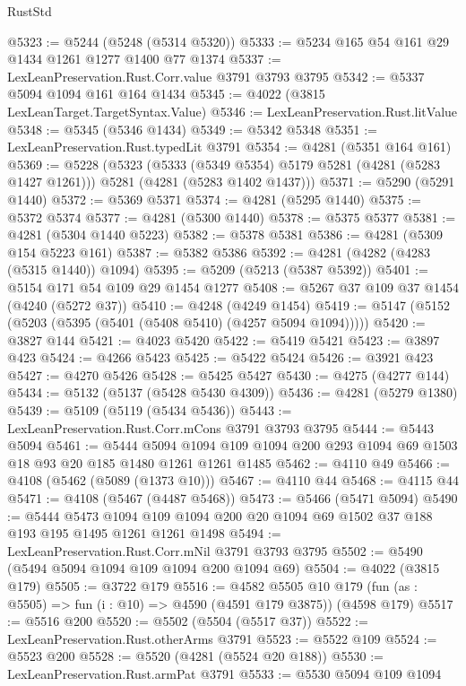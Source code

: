 \begin{lexlean}{RustStd}
\begin{coremodule}
{\begin{coremodule}
{{{{{{{{{{{{{{{{{{{{{{{{{{{{{{{{{{{@5323 := @5244 (@5248 (@5314 @5320))
@5333 := @5234 @165 @54 @161 @29 @1434 @1261 @1277 @1400 @77 @1374
@5337 := LexLeanPreservation.Rust.Corr.value @3791 @3793 @3795
@5342 := @5337 @5094 @1094 @161 @164 @1434
@5345 := @4022 (@3815 LexLeanTarget.TargetSyntax.Value)
@5346 := LexLeanPreservation.Rust.litValue
@5348 := @5345 (@5346 @1434)
@5349 := @5342 @5348
@5351 := LexLeanPreservation.Rust.typedLit @3791
@5354 := @4281 (@5351 @164 @161)
@5369 := @5228
    (@5323
      (@5333 (@5349 @5354) @5179 @5281 (@4281 (@5283 @1427 @1261)))
      @5281
      (@4281 (@5283 @1402 @1437)))
@5371 := @5290 (@5291 @1440)
@5372 := @5369 @5371
@5374 := @4281 (@5295 @1440)
@5375 := @5372 @5374
@5377 := @4281 (@5300 @1440)
@5378 := @5375 @5377
@5381 := @4281 (@5304 @1440 @5223)
@5382 := @5378 @5381
@5386 := @4281 (@5309 @154 @5223 @161)
@5387 := @5382 @5386
@5392 := @4281 (@4282 (@4283 (@5315 @1440)) @1094)
@5395 := @5209 (@5213 (@5387 @5392))
@5401 := @5154 @171 @54 @109 @29 @1454 @1277
@5408 := @5267 @37 @109 @37 @1454 (@4240 (@5272 @37))
@5410 := @4248 (@4249 @1454)
@5419 := @5147 (@5152 (@5203 (@5395 (@5401 (@5408 @5410) (@4257 @5094 @1094)))))
@5420 := @3827 @144
@5421 := @4023 @5420
@5422 := @5419 @5421
@5423 := @3897 @423
@5424 := @4266 @5423
@5425 := @5422 @5424
@5426 := @3921 @423
@5427 := @4270 @5426
@5428 := @5425 @5427
@5430 := @4275 (@4277 @144)
@5434 := @5132 (@5137 (@5428 @5430 @4309))
@5436 := @4281 (@5279 @1380)
@5439 := @5109 (@5119 (@5434 @5436))
@5443 := LexLeanPreservation.Rust.Corr.mCons @3791 @3793 @3795
@5444 := @5443 @5094
@5461 := @5444
    @5094
    @1094
    @109
    @1094
    @200
    @293
    @1094
    @69
    @1503
    @18
    @93
    @20
    @185
    @1480
    @1261
    @1261
    @1485
@5462 := @4110 @49
@5466 := @4108 (@5462 (@5089 (@1373 @10)))
@5467 := @4110 @44
@5468 := @4115 @44
@5471 := @4108 (@5467 (@4487 @5468))
@5473 := @5466 (@5471 @5094)
@5490 := @5444
    @5473
    @1094
    @109
    @1094
    @200
    @20
    @1094
    @69
    @1502
    @37
    @188
    @193
    @195
    @1495
    @1261
    @1261
    @1498
@5494 := LexLeanPreservation.Rust.Corr.mNil @3791 @3793 @3795
@5502 := @5490 (@5494 @5094 @1094 @109 @1094 @200 @1094 @69)
@5504 := @4022 (@3815 @179)
@5505 := @3722 @179
@5516 := @4582
    @5505
    @10
    @179
    (fun (as : @5505) => fun (i : @10) => @4590 (@4591 @179 @3875))
    (@4598 @179)
@5517 := @5516 @200
@5520 := @5502 (@5504 (@5517 @37))
@5522 := LexLeanPreservation.Rust.otherArms @3791
@5523 := @5522 @109
@5524 := @5523 @200
@5528 := @5520 (@4281 (@5524 @20 @188))
@5530 := LexLeanPreservation.Rust.armPat @3791
@5533 := @5530 @5094 @109 @1094
}}}}}}}}}}}}}}}}}}}}}}}}}}}}}}}}}}}
\end{coremodule}}
\end{coremodule}
\end{lexlean}
